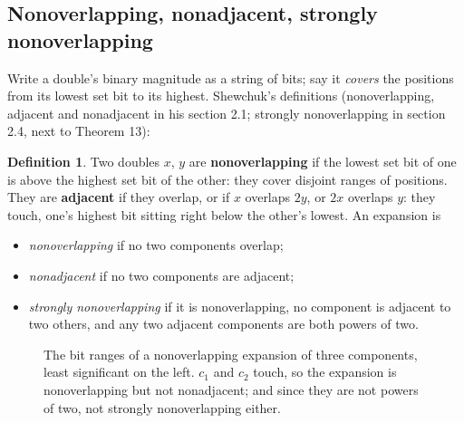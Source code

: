 \documentclass[11pt,a4paper]{article}
\theoremstyle{definition}
\newtheorem{definition}{Definition}
\theoremstyle{remark}
\begin{document}
\subsection{Nonoverlapping, nonadjacent, strongly nonoverlapping}

Write a double's binary magnitude as a string of bits; say it \emph{covers} the positions from
its lowest set bit to its highest. Shewchuk's definitions (nonoverlapping, adjacent and
nonadjacent in his section 2.1; strongly nonoverlapping in section 2.4, next to Theorem 13):

\begin{definition}
Two doubles $x$, $y$ are \textbf{nonoverlapping} if the lowest set bit of one is above the
highest set bit of the other: they cover disjoint ranges of positions. They are
\textbf{adjacent} if they overlap, or if $x$ overlaps $2y$, or $2x$ overlaps $y$: they touch,
one's highest bit sitting right below the other's lowest. An expansion is
\begin{itemize}
  \item \emph{nonoverlapping} if no two components overlap;
  \item \emph{nonadjacent} if no two components are adjacent;
  \item \emph{strongly nonoverlapping} if it is nonoverlapping, no component is adjacent to two
    others, and any two adjacent components are both powers of two.
\end{itemize}
\end{definition}

\begin{figure}[ht]
\centering
{}
\caption{The bit ranges of a nonoverlapping expansion of three components, least significant
on the left. $c_1$ and $c_2$ touch, so the expansion is nonoverlapping but not nonadjacent; and
since they are not powers of two, not strongly nonoverlapping either.}
\label{fig:bits}
\end{figure}
\end{document}
